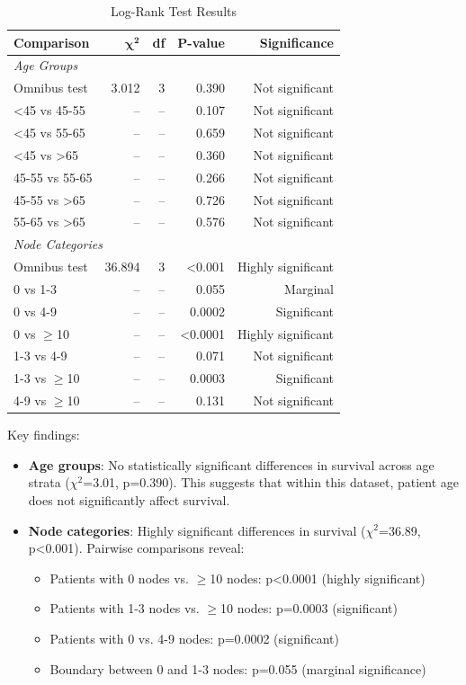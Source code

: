 \documentclass[12pt,a4paper]{article}
\begin{document}
\begin{table}[H]
\centering
\caption{Log-Rank Test Results}
\label{tab:logrank_results}
\begin{tabular}{lrrrr}
\toprule
\textbf{Comparison} & \(\boldsymbol{\chi^2}\) & \textbf{df} & \textbf{P-value} & \textbf{Significance} \\
\midrule
\multicolumn{5}{l}{\textit{Age Groups}} \\
Omnibus test & 3.012 & 3 & 0.390 & Not significant \\
\cmidrule(l){2-5}
<45 vs 45-55 & -- & -- & 0.107 & Not significant \\
<45 vs 55-65 & -- & -- & 0.659 & Not significant \\
<45 vs >65 & -- & -- & 0.360 & Not significant \\
45-55 vs 55-65 & -- & -- & 0.266 & Not significant \\
45-55 vs >65 & -- & -- & 0.726 & Not significant \\
55-65 vs >65 & -- & -- & 0.576 & Not significant \\
\midrule
\multicolumn{5}{l}{\textit{Node Categories}} \\
Omnibus test & 36.894 & 3 & <0.001 & Highly significant \\
\cmidrule(l){2-5}
0 vs 1-3 & -- & -- & 0.055 & Marginal \\
0 vs 4-9 & -- & -- & 0.0002 & Significant \\
0 vs $\geq$10 & -- & -- & <0.0001 & Highly significant \\
1-3 vs 4-9 & -- & -- & 0.071 & Not significant \\
1-3 vs $\geq$10 & -- & -- & 0.0003 & Significant \\
4-9 vs $\geq$10 & -- & -- & 0.131 & Not significant \\
\bottomrule
\end{tabular}
\end{table}

Key findings:
\begin{itemize}
    \item \textbf{Age groups}: No statistically significant differences in survival across age strata ($\chi^2$=3.01, p=0.390). This suggests that within this dataset, patient age does not significantly affect survival.
    
    \item \textbf{Node categories}: Highly significant differences in survival ($\chi^2$=36.89, p<0.001). Pairwise comparisons reveal:
    \begin{itemize}
        \item Patients with 0 nodes vs. $\geq$10 nodes: p<0.0001 (highly significant)
        \item Patients with 1-3 nodes vs. $\geq$10 nodes: p=0.0003 (significant)
        \item Patients with 0 vs. 4-9 nodes: p=0.0002 (significant)
        \item Boundary between 0 and 1-3 nodes: p=0.055 (marginal significance)
    \end{itemize}
\end{itemize}
\end{document}
